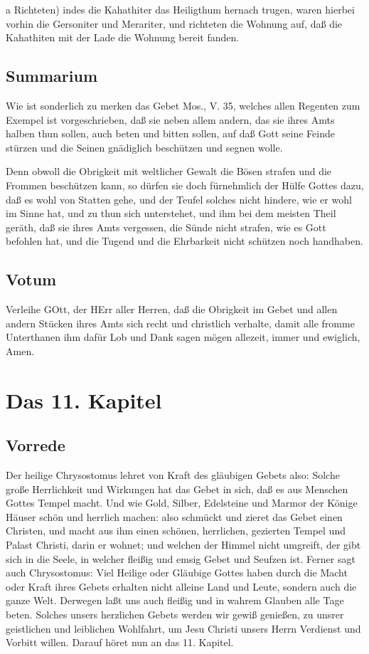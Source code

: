 a Richteten) indes die Kahathiter das Heiligthum hernach trugen, waren hierbei vorhin die Gersoniter und Merariter, und richteten die Wohnung auf, daß die Kahathiten mit der Lade die Wohnung bereit fanden.

\section{Summarium}

Wie ist sonderlich zu merken das Gebet Mos., V. 35, welches allen Regenten zum Exempel ist vorgeschrieben, daß sie neben allem andern, das sie ihres Amts halben thun sollen, auch beten und bitten sollen, auf daß Gott seine Feinde stürzen und die Seinen gnädiglich beschützen und segnen wolle.

Denn obwoll die Obrigkeit mit weltlicher Gewalt die Bösen strafen und die Frommen beschützen kann, so dürfen sie doch fürnehmlich der Hülfe Gottes dazu, daß es wohl von Statten gehe, und der Teufel solches nicht hindere, wie er wohl im Sinne hat, und zu thun sich unterstehet, und ihm bei dem meisten Theil geräth, daß sie ihres Amts vergessen, die Sünde nicht strafen, wie es Gott befohlen hat, und die Tugend und die Ehrbarkeit nicht schützen noch handhaben.

\section{Votum}

Verleihe GOtt, der HErr aller Herren, daß die Obrigkeit im Gebet und allen andern Stücken ihres Amts sich recht und christlich verhalte, damit alle fromme Unterthanen ihm dafür Lob und Dank sagen mögen allezeit, immer und ewiglich, Amen.

\chapter{Das 11. Kapitel}

\section{Vorrede}

Der heilige Chrysostomus lehret von Kraft des gläubigen Gebets also: Solche große Herrlichkeit und Wirkungen hat das Gebet in sich, daß es aus Menschen Gottes Tempel macht. Und wie Gold, Silber, Edelsteine und Marmor der Könige Häuser schön und herrlich machen: also schmückt und zieret das Gebet einen Christen, und macht aus ihm einen schönen, herrlichen, gezierten Tempel und Palast Christi, darin er wohnet; und welchen der Himmel nicht umgreift, der gibt sich in die Seele, in welcher fleißig und emsig Gebet und Seufzen ist. Ferner sagt auch Chrysostomus: Viel Heilige oder Gläubige Gottes haben durch die Macht oder Kraft ihres Gebets erhalten nicht alleine Land und Leute, sondern auch die ganze Welt. Derwegen laßt uns auch fleißig und in wahrem Glauben alle Tage beten. Solches unsers herzlichen Gebets werden wir gewiß genießen, zu unsrer geistlichen und leiblichen Wohlfahrt, um Jesu Christi unsers Herrn Verdienst und Vorbitt willen. Darauf höret nun an das 11. Kapitel.

